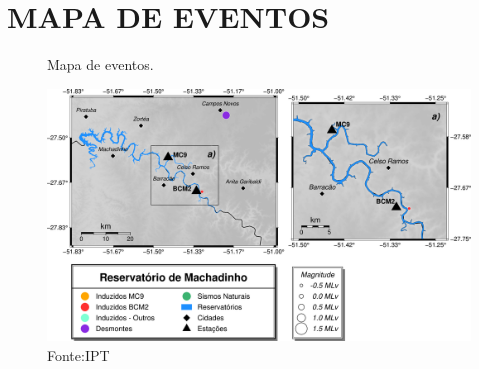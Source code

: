 \section{MAPA DE EVENTOS}
\label{sec:mapa}
\begin{figure}[ht]
    \centering
	\captionsetup{justification=raggedright, singlelinecheck=false, width=1\textwidth}
    \caption{Mapa de eventos.}
    \includegraphics[width=1.0\textwidth]{../figuras/mapaevents.png} %
    \caption*{Fonte:IPT}
\end{figure}

